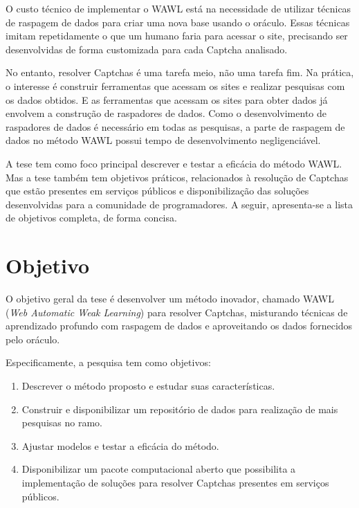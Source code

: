 \documentclass[12pt,twoside,brazilian]{book}
\providecommand{\tightlist}{%
  \setlength{\itemsep}{0pt}\setlength{\parskip}{0pt}}
\begin{document}
O custo técnico de implementar o WAWL está na necessidade de utilizar
técnicas de raspagem de dados para criar uma nova base usando o oráculo.
Essas técnicas imitam repetidamente o que um humano faria para acessar o
site, precisando ser desenvolvidas de forma customizada para cada
Captcha analisado.

No entanto, resolver Captchas é uma tarefa meio, não uma tarefa fim. Na
prática, o interesse é construir ferramentas que acessam os sites e
realizar pesquisas com os dados obtidos. E as ferramentas que acessam os
sites para obter dados já envolvem a construção de raspadores de dados.
Como o desenvolvimento de raspadores de dados é necessário em todas as
pesquisas, a parte de raspagem de dados no método WAWL possui tempo de
desenvolvimento negligenciável.

A tese tem como foco principal descrever e testar a eficácia do método
WAWL. Mas a tese também tem objetivos práticos, relacionados à resolução
de Captchas que estão presentes em serviços públicos e disponibilização
das soluções desenvolvidas para a comunidade de programadores. A seguir,
apresenta-se a lista de objetivos completa, de forma concisa.

\hypertarget{sec-objetivos}{%
\section{Objetivo}\label{sec-objetivos}}

O objetivo geral da tese é desenvolver um método inovador, chamado WAWL
(\emph{Web Automatic Weak Learning}) para resolver Captchas, misturando
técnicas de aprendizado profundo com raspagem de dados e aproveitando os
dados fornecidos pelo oráculo.

Especificamente, a pesquisa tem como objetivos:

\begin{enumerate}
\def\labelenumi{\arabic{enumi}.}
\tightlist
\item
  Descrever o método proposto e estudar suas características.
\item
  Construir e disponibilizar um repositório de dados para realização de
  mais pesquisas no ramo.
\item
  Ajustar modelos e testar a eficácia do método.
\item
  Disponibilizar um pacote computacional aberto que possibilita a
  implementação de soluções para resolver Captchas presentes em serviços
  públicos.
\end{enumerate}
\end{document}

